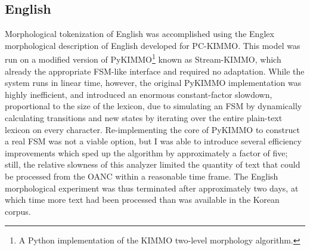\subsection{English}
Morphological tokenization of English was accomplished using the Englex morphological description of English\cite{antworthenglex} developed for PC-KIMMO\cite{koskenniemi84}. This model was run on a modified version of PyKIMMO\footnote{A Python implementation of the KIMMO two-level morphology algorithm.} known as Stream-KIMMO\cite{kearsley13}, which already the appropriate FSM-like interface and required no adaptation. While the system runs in linear time, however, the original PyKIMMO implementation was highly inefficient, and introduced an enormous constant-factor slowdown, proportional to the size of the lexicon, due to simulating an FSM by dynamically calculating transitions and new states by iterating over the entire plain-text lexicon on every character. Re-implementing the core of PyKIMMO to construct a real FSM was not a viable option, but I was able to introduce several efficiency improvements which sped up the algorithm by approximately a factor of five; still, the relative slowness of this analyzer limited the quantity of text that could be processed from the OANC within a reasonable time frame. The English morphological experiment was thus terminated after approximately two days, at which time more text had been processed than was available in the Korean corpus.

